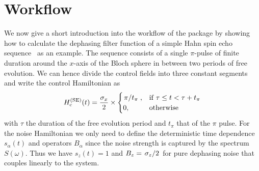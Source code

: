 \section{Workflow}\label{sec:ff:software:workflow}
We now give a short introduction into the workflow of the \filterfunctions package by showing how to calculate the dephasing filter function of a simple Hahn spin echo sequence~\cite{Hahn1950} as an example.
The sequence consists of a single $\pi$-pulse of finite duration around the $x$-axis of the Bloch sphere in between two periods of free evolution.
We can hence divide the control fields into three constant segments and write the control Hamiltonian as
\begin{equation}
    \Hc\gth{\mr{SE}}(t) = \frac{\px}{2}\times\begin{cases}
        \flatfrac{\pi}{t_\pi},  &\mr{if\;} \tau\leq t < \tau + t_\pi \\
        0,                      &\mr{otherwise} \\
    \end{cases}
\end{equation}
with $\tau$ the duration of the free evolution period and $t_\pi$ that of the $\pi$ pulse.
For the noise Hamiltonian we only need to define the deterministic time dependence $s_\alpha(t)$ and operators $B_\alpha$ since the noise strength is captured by the spectrum $S(\omega)$.
Thus we have $s_z(t) =  1$ and $B_z = \flatfrac{\pz}{2}$ for pure dephasing noise that couples linearly to the system.

